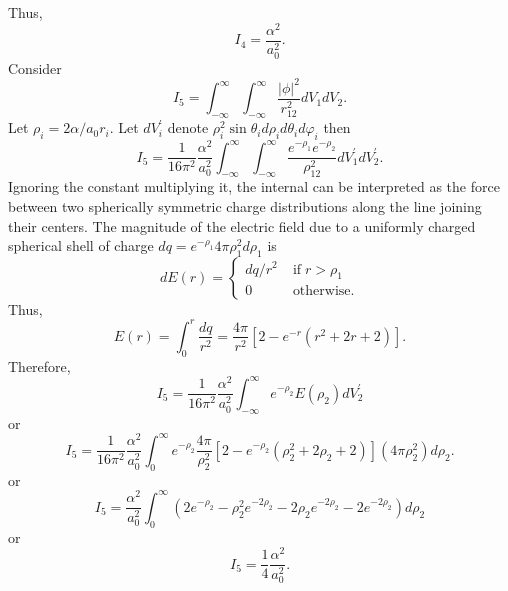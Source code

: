 \documentclass{article}
\numberwithin{equation}{section}
\begin{document}
Thus,
\begin{equation}\label{s5e76}
I_4 = \frac{\alpha^2}{a_0^2}.
\end{equation}
Consider
\[
I_5 = \int_{-\infty}^\infty\int_{-\infty}^\infty \frac{|\phi|^2}{r_{12}^2}
dV_1 dV_2.
\]
Let $\rho_i = 2\alpha/a_0 r_i$. Let $dV_i^\prime$ denote $\rho_i^2
\sin\theta_i d\rho_i d\theta_id\varphi_i$ then
\[
I_5 = \frac{1}{16\pi^2}\frac{\alpha^2}{a_0^2}
\int_{-\infty}^\infty \int_{-\infty}^\infty \frac{e^{-\rho_1}
    e^{-\rho_2}}{\rho_{12}^2}dV_1^\prime dV_2^\prime.
\]
Ignoring the constant multiplying it, the internal can be interpreted as 
the force between two spherically symmetric charge distributions along 
the line joining their centers. The magnitude of the electric field due to 
a uniformly charged spherical shell of charge $dq = e^{-\rho_1}4\pi
\rho_1^2d\rho_1$ is
\[
dE(r) = \begin{cases}
dq/r^2 & \;\text{if}\; r > \rho_1 \\
0 & \;\text{otherwise.}
\end{cases}
\]
Thus,
\[
E(r) = \int_0^r \frac{dq}{r^2} = \frac{4\pi}{r^2}\left[2 - e^{-r}
(r^2 + 2r  + 2)\right].
\]
Therefore,
\[
I_5 = \frac{1}{16\pi^2}\frac{\alpha^2}{a_0^2}\int_{-\infty}^\infty 
e^{-\rho_2}E(\rho_2)dV_2^\prime
\]
or
\[
I_5 = \frac{1}{16\pi^2}\frac{\alpha^2}{a_0^2}\int_0^\infty e^{-\rho_2}
\frac{4\pi}{\rho_2^2}\left[2 - e^{-\rho_2}(\rho_2^2 + 2\rho_2 + 2)\right]
(4\pi\rho_2^2)d\rho_2.
\]
or
\[
I_5 = \frac{\alpha^2}{a_0^2}\int_0^\infty(2e^{-\rho_2} - \rho_2^2
	e^{-2\rho_2} - 2\rho_2e^{-2\rho_2} - 2e^{-2\rho_2})d\rho_2
\]
or
\begin{equation}\label{s5e77}
I_5 = \frac{1}{4}\frac{\alpha^2}{a_0^2}.
\end{equation}
\end{document}
